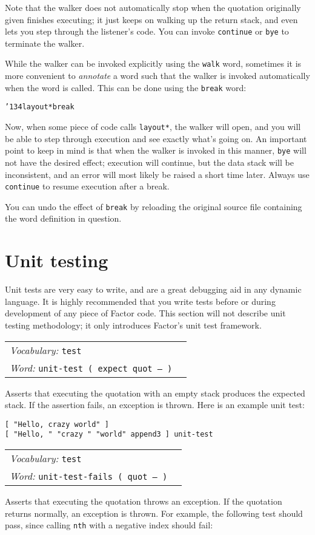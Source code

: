 \documentclass{book}
\newcommand{\bs}{\char'134}
\newcommand{\vocabulary}[1]{\emph{Vocabulary:} \texttt{#1}&\\}
\newcommand{\ordinaryword}[2]{\index{\texttt{#1}}\emph{Word:} \texttt{#2}&\\}
\newcommand{\wordtable}[1]{


\begin{tabularx}{12cm}{lX}
\hline
#1
\hline
\end{tabularx}

}
\begin{document}
Note that the walker does not automatically stop when the quotation originally given finishes executing; it just keeps on walking up the return stack, and even lets you step through the listener's code. You can invoke \texttt{continue} or \texttt{bye} to terminate the walker.

While the walker can be invoked explicitly using the \texttt{walk} word, sometimes it is more convenient to \emph{annotate} a word such that the walker is invoked automatically when the word is called. This can be done using the \texttt{break} word:

\begin{alltt}
  \bs layout* break
\end{alltt}

Now, when some piece of code calls \texttt{layout*}, the walker will open, and you will be able to step through execution and see exactly what's going on. An important point to keep in mind is that when the walker is invoked in this manner, \texttt{bye} will not have the desired effect; execution will continue, but the data stack will be inconsistent, and an error will most likely be raised a short time later. Always use \texttt{continue} to resume execution after a break.

You can undo the effect of \texttt{break} by reloading the original source file containing the word definition in question.

\section{Unit testing}

Unit tests are very easy to write, and are a great debugging aid in any dynamic language.
It is highly recommended that you write tests before or during development of any piece of Factor code. This section will not describe unit testing methodology; it only introduces Factor's unit test framework.
\wordtable{
\vocabulary{test}
\ordinaryword{unit-test}{unit-test ( expect quot -- )}
}
Asserts that executing the quotation with an empty stack produces the expected stack. If the assertion fails, an exception is thrown. Here is an example unit test:

\begin{verbatim}
[ "Hello, crazy world" ]
[ "Hello, " "crazy " "world" append3 ] unit-test
\end{verbatim}

\wordtable{
\vocabulary{test}
\ordinaryword{unit-test-fails}{unit-test-fails ( quot -- )}
}
Asserts that executing the quotation throws an exception. If the quotation returns normally, an exception is thrown. For example, the following test should pass, since calling \verb|nth| with a negative index should fail:
\end{document}
